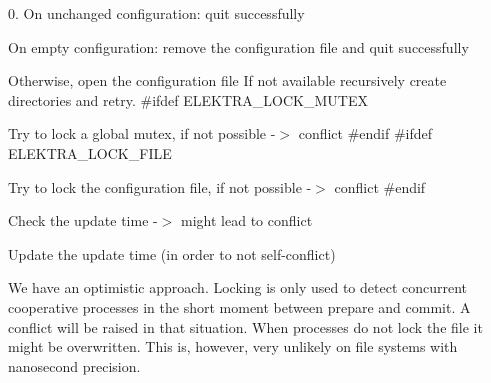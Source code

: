 0. On unchanged configuration\+: quit successfully
\begin{DoxyEnumerate}
\item On empty configuration\+: remove the configuration file and quit successfully
\item Otherwise, open the configuration file If not available recursively create directories and retry. \#ifdef E\+L\+E\+K\+T\+R\+A\+\_\+\+L\+O\+C\+K\+\_\+\+M\+U\+T\+E\+X
\item Try to lock a global mutex, if not possible -\/$>$ conflict \#endif \#ifdef E\+L\+E\+K\+T\+R\+A\+\_\+\+L\+O\+C\+K\+\_\+\+F\+I\+L\+E
\item Try to lock the configuration file, if not possible -\/$>$ conflict \#endif
\item Check the update time -\/$>$ might lead to conflict
\item Update the update time (in order to not self-\/conflict)
\end{DoxyEnumerate}

We have an optimistic approach. Locking is only used to detect concurrent cooperative processes in the short moment between prepare and commit. A conflict will be raised in that situation. When processes do not lock the file it might be overwritten. This is, however, very unlikely on file systems with nanosecond precision. 